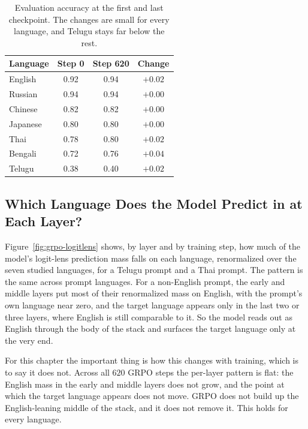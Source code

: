 \begin{table}[t]
	\centering
	\renewcommand{\arraystretch}{1.2}
	\begin{tabular}{lccc}
		\toprule
		\textbf{Language} & \textbf{Step 0} & \textbf{Step 620} & \textbf{Change} \\
		\midrule
		English  & 0.92 & 0.94 & $+0.02$ \\
		Russian  & 0.94 & 0.94 & $+0.00$ \\
		Chinese  & 0.82 & 0.82 & $+0.00$ \\
		Japanese & 0.80 & 0.80 & $+0.00$ \\
		Thai     & 0.78 & 0.80 & $+0.02$ \\
		Bengali  & 0.72 & 0.76 & $+0.04$ \\
		Telugu   & 0.38 & 0.40 & $+0.02$ \\
		\bottomrule
	\end{tabular}
	\caption{Evaluation accuracy at the first and last checkpoint. The changes are
		small for every language, and Telugu stays far below the rest.}
	\label{tab:grpo-acc}
\end{table}

\subsection{Which Language Does the Model Predict in at Each Layer?}
\label{subsec:grpo-logitlens}

Figure~\ref{fig:grpo-logitlens} shows, by layer and by training step, how much of the
model's logit-lens prediction mass falls on each language, renormalized over the
seven studied languages, for a Telugu prompt and a Thai prompt. The pattern is the
same across prompt languages. For a non-English prompt, the early and middle layers
put most of their renormalized mass on English, with the prompt's own language near
zero, and the target language appears only in the last two or three layers, where
English is still comparable to it. So the model reads out as English through the body
of the stack and surfaces the target language only at the very end.

For this chapter the important thing is how this changes with training, which is to
say it does not. Across all $620$ GRPO steps the per-layer pattern is flat: the
English mass in the early and middle layers does not grow, and the point at which the
target language appears does not move. GRPO does not build up the English-leaning
middle of the stack, and it does not remove it. This holds for every language.

